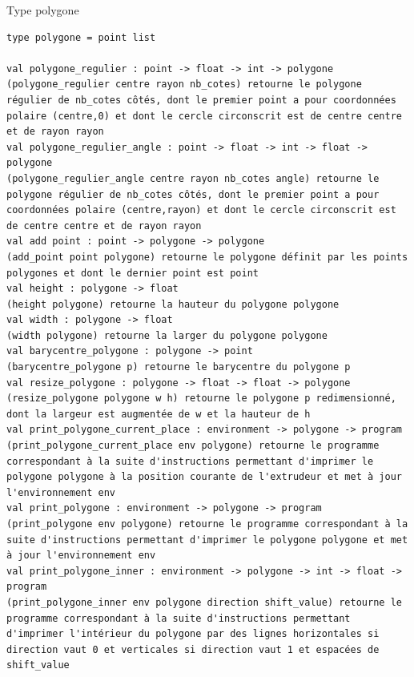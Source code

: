 \documentclass[11pt, titlepage]{article}
\begin{document}
\newline
Type polygone
\begin{lstlisting}
type polygone = point list
	    
val polygone_regulier : point -> float -> int -> polygone
(polygone_regulier centre rayon nb_cotes) retourne le polygone régulier de nb_cotes côtés, dont le premier point a pour coordonnées polaire (centre,0) et dont le cercle circonscrit est de centre centre et de rayon rayon
val polygone_regulier_angle : point -> float -> int -> float -> polygone
(polygone_regulier_angle centre rayon nb_cotes angle) retourne le polygone régulier de nb_cotes côtés, dont le premier point a pour coordonnées polaire (centre,rayon) et dont le cercle circonscrit est de centre centre et de rayon rayon
val add point : point -> polygone -> polygone
(add_point point polygone) retourne le polygone définit par les points polygones et dont le dernier point est point
val height : polygone -> float
(height polygone) retourne la hauteur du polygone polygone
val width : polygone -> float
(width polygone) retourne la larger du polygone polygone
val barycentre_polygone : polygone -> point
(barycentre_polygone p) retourne le barycentre du polygone p
val resize_polygone : polygone -> float -> float -> polygone 
(resize_polygone polygone w h) retourne le polygone p redimensionné, dont la largeur est augmentée de w et la hauteur de h
val print_polygone_current_place : environment -> polygone -> program
(print_polygone_current_place env polygone) retourne le programme correspondant à la suite d'instructions permettant d'imprimer le polygone polygone à la position courante de l'extrudeur et met à jour l'environnement env
val print_polygone : environment -> polygone -> program
(print_polygone env polygone) retourne le programme correspondant à la suite d'instructions permettant d'imprimer le polygone polygone et met à jour l'environnement env
val print_polygone_inner : environment -> polygone -> int -> float -> program
(print_polygone_inner env polygone direction shift_value) retourne le programme correspondant à la suite d'instructions permettant d'imprimer l'intérieur du polygone par des lignes horizontales si direction vaut 0 et verticales si direction vaut 1 et espacées de shift_value
\end{lstlisting}
\end{document}

